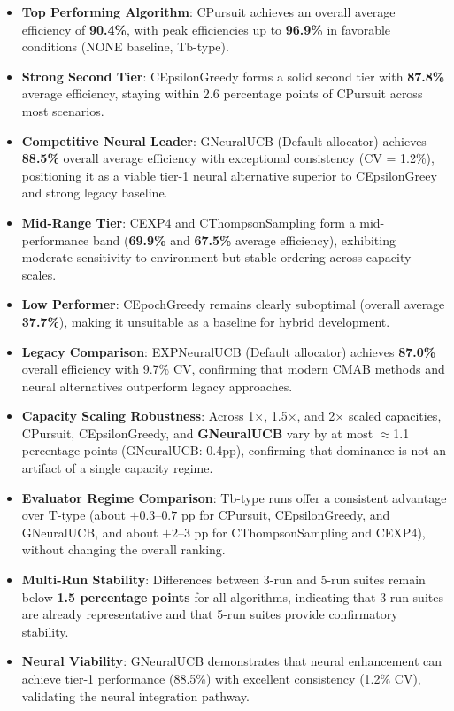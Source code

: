 \documentclass[12pt,a4paper]{article}
\newcommand{\performance}[1]{\textcolor{performancecolor}{\textbf{#1}}}
\newcommand{\critical}[1]{\textcolor{criticalcolor}{\textbf{#1}}}
\newcommand{\success}[1]{\textcolor{successcolor}{\textbf{#1}}}
\newcommand{\legacy}[1]{\textcolor{legacycolor}{\textbf{#1}}}
\newcommand{\neural}[1]{\textcolor{neuralcolor}{\textbf{#1}}}
\begin{document}
\begin{tcolorbox}[colback=highlightcolor!30,colframe=performancecolor,title=\textbf{Key Experimental Results Summary (3-run/5-run, 1$\times$–2$\times$ Capacities, T/Tb Regimes)}]
\begin{itemize}
\item \performance{Top Performing Algorithm}: CPursuit achieves an overall average efficiency of \textbf{90.4\%}, with peak efficiencies up to \textbf{96.9\%} in favorable conditions (NONE baseline, Tb-type).
\item \performance{Strong Second Tier}: CEpsilonGreedy forms a solid second tier with \textbf{87.8\%} average efficiency, staying within 2.6 percentage points of CPursuit across most scenarios.
\item \neural{Competitive Neural Leader}: GNeuralUCB (Default allocator) achieves \textbf{88.5\%} overall average efficiency with exceptional consistency (CV = 1.2\%), positioning it as a viable tier-1 neural alternative superior to CEpsilonGreey and strong legacy baseline.
\item \performance{Mid-Range Tier}: CEXP4 and CThompsonSampling form a mid-performance band (\textbf{69.9\%} and \textbf{67.5\%} average efficiency), exhibiting moderate sensitivity to environment but stable ordering across capacity scales.
\item \critical{Low Performer}: CEpochGreedy remains clearly suboptimal (overall average \textbf{37.7\%}), making it unsuitable as a baseline for hybrid development.
\item \legacy{Legacy Comparison}: EXPNeuralUCB (Default allocator) achieves \textbf{87.0\%} overall efficiency with 9.7\% CV, confirming that modern CMAB methods and neural alternatives outperform legacy approaches.
\item \success{Capacity Scaling Robustness}: Across 1$\times$, 1.5$\times$, and 2$\times$ scaled capacities, CPursuit, CEpsilonGreedy, and \neural{GNeuralUCB} vary by at most $\approx$1.1 percentage points (GNeuralUCB: 0.4pp), confirming that dominance is not an artifact of a single capacity regime.
\item \success{Evaluator Regime Comparison}: Tb-type runs offer a consistent advantage over T-type (about $+0.3$--$0.7$ pp for CPursuit, CEpsilonGreedy, and GNeuralUCB, and about $+2$--$3$ pp for CThompsonSampling and CEXP4), without changing the overall ranking.
\item \success{Multi-Run Stability}: Differences between 3-run and 5-run suites remain below \textbf{1.5 percentage points} for all algorithms, indicating that 3-run suites are already representative and that 5-run suites provide confirmatory stability.
\item \neural{Neural Viability}: GNeuralUCB demonstrates that neural enhancement can achieve tier-1 performance (88.5\%) with excellent consistency (1.2\% CV), validating the neural integration pathway.
\end{itemize}
\end{tcolorbox}
\end{document}

